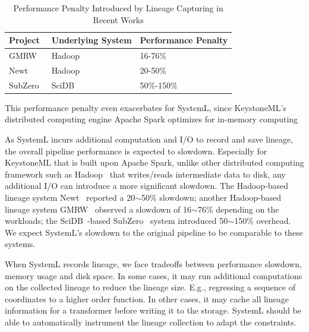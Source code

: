 \documentclass{sig-alternate}
\begin{document}
\begin{table}[ht]
\begin{center}
    \caption{Performance Penalty Introduced by Lineage Capturing in Recent Works}
    \begin{scriptsize}
    \begin{tabular}{ | p{2.25cm} | p{2.25cm} | p{2.25cm} |}
    \hline
    Project & Underlying System & Performance Penalty  \\ \hline \hline
    GMRW~\cite{ikeda11} & Hadoop~\cite{HADOOP} & 16-76\% \\ \hline
    Newt~\cite{logothetis13} & Hadoop~\cite{HADOOP} & 20-50\% \\ \hline
    SubZero~\cite{wu13} & SciDB~\cite{brown10} & 50\%-150\% \\ \hline
    \end{tabular}
    \end{scriptsize}
    \label{tb:overhead}
\end{center}   
\end{table}

This performance penalty even exacerbates for SystemL, since KeystoneML's distributed computing engine Apache Spark 
optimizes for in-memory computing

As SystemL incurs additional computation and I/O to record and save lineage, the overall pipeline performance is expected to slowdown.
Especially for KeystoneML that is built upon Apache Spark, unlike other distributed computing framework such as Hadoop~\cite{HADOOP} 
that writes/reads intermediate data to disk, any additional I/O can introduce a more significant slowdown. 
The Hadoop-based lineage system Newt~\cite{logothetis13} reported a 20$\sim$50\% slowdown; 
another Hadoop-based lineage system GMRW~\cite{ikeda11} observed a slowdown of 16$\sim$76\% depending on the workloads;
the SciDB~\cite{brown10}-based SubZero~\cite{wu13} system introduced 50$\sim$150\% overhead. 
We expect SystemL's slowdown to the original pipeline to be comparable to these systems.

When SystemL records lineage, we face tradeoffs between performance slowdown, memory usage and disk space.
In some cases, it may run additional computations on the collected lineage to reduce the lineage size. 
E.g., regressing a sequence of coordinates to a higher order function. 
In other cases, it may cache all lineage information for a transformer before writing it to the storage. 
SystemL should be able to automatically instrument the lineage collection to adapt the constraints.
\end{document}
